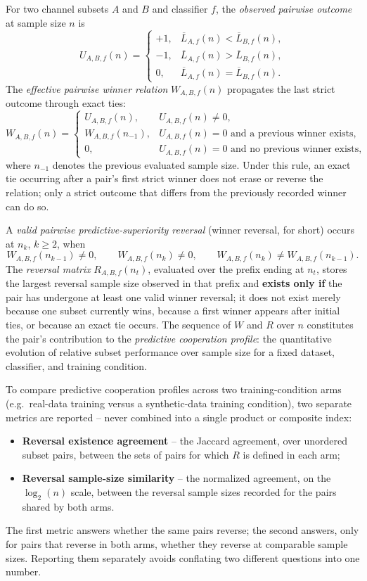 \documentclass[11pt,a4paper]{article}
\begin{document}
For two channel subsets $A$ and $B$ and classifier $f$, the \emph{observed pairwise outcome} at sample size $n$ is
\[
U_{A,B,f}(n)=
\begin{cases}
+1, & \overline{L}_{A,f}(n)<\overline{L}_{B,f}(n),\\
-1, & \overline{L}_{A,f}(n)>\overline{L}_{B,f}(n),\\
0, & \overline{L}_{A,f}(n)=\overline{L}_{B,f}(n).
\end{cases}
\]
The \emph{effective pairwise winner relation} $W_{A,B,f}(n)$ propagates the last strict outcome through exact ties:
\[
W_{A,B,f}(n)=
\begin{cases}
U_{A,B,f}(n), & U_{A,B,f}(n)\neq 0,\\
W_{A,B,f}(n_{-1}), & U_{A,B,f}(n)=0 \text{ and a previous winner exists},\\
0, & U_{A,B,f}(n)=0 \text{ and no previous winner exists},
\end{cases}
\]
where $n_{-1}$ denotes the previous evaluated sample size. Under this rule, an exact tie occurring after a pair's first strict winner does not erase or reverse the relation; only a strict outcome that differs from the previously recorded winner can do so.

A \emph{valid pairwise predictive-superiority reversal} (winner reversal, for short) occurs at $n_k$, $k\geq 2$, when
\[
W_{A,B,f}(n_{k-1})\neq 0,\qquad W_{A,B,f}(n_k)\neq 0,\qquad W_{A,B,f}(n_k)\neq W_{A,B,f}(n_{k-1}).
\]
The \emph{reversal matrix} $R_{A,B,f}(n_t)$, evaluated over the prefix ending at $n_t$, stores the largest reversal sample size observed in that prefix and \textbf{exists only if} the pair has undergone at least one valid winner reversal; it does not exist merely because one subset currently wins, because a first winner appears after initial ties, or because an exact tie occurs. The sequence of $W$ and $R$ over $n$ constitutes the pair's contribution to the \emph{predictive cooperation profile}: the quantitative evolution of relative subset performance over sample size for a fixed dataset, classifier, and training condition.

To compare predictive cooperation profiles across two training-condition arms (e.g.\ real-data training versus a synthetic-data training condition), two separate metrics are reported -- never combined into a single product or composite index:
\begin{itemize}
    \item \textbf{Reversal existence agreement} -- the Jaccard agreement, over unordered subset pairs, between the sets of pairs for which $R$ is defined in each arm;
    \item \textbf{Reversal sample-size similarity} -- the normalized agreement, on the $\log_2(n)$ scale, between the reversal sample sizes recorded for the pairs shared by both arms.
\end{itemize}
The first metric answers whether the same pairs reverse; the second answers, only for pairs that reverse in both arms, whether they reverse at comparable sample sizes. Reporting them separately avoids conflating two different questions into one number.
\end{document}
